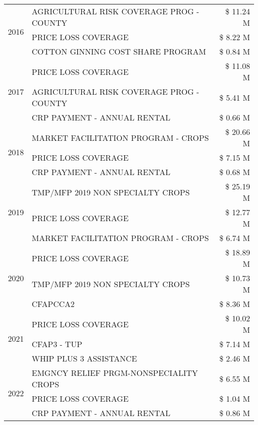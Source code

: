 \begin{tabular}{llr}
\cline{1-3}
\multirow[t]{3}{*}{2016} & AGRICULTURAL RISK COVERAGE PROG - COUNTY & \$ 11.24 M \\
 & PRICE LOSS COVERAGE & \$ 8.22 M \\
 & COTTON GINNING COST SHARE PROGRAM & \$ 0.84 M \\
\cline{1-3}
\multirow[t]{3}{*}{2017} & PRICE LOSS COVERAGE & \$ 11.08 M \\
 & AGRICULTURAL RISK COVERAGE PROG - COUNTY & \$ 5.41 M \\
 & CRP PAYMENT - ANNUAL RENTAL & \$ 0.66 M \\
\cline{1-3}
\multirow[t]{3}{*}{2018} & MARKET FACILITATION PROGRAM - CROPS & \$ 20.66 M \\
 & PRICE LOSS COVERAGE & \$ 7.15 M \\
 & CRP PAYMENT - ANNUAL RENTAL & \$ 0.68 M \\
\cline{1-3}
\multirow[t]{3}{*}{2019} & TMP/MFP 2019 NON SPECIALTY CROPS & \$ 25.19 M \\
 & PRICE LOSS COVERAGE & \$ 12.77 M \\
 & MARKET FACILITATION PROGRAM - CROPS & \$ 6.74 M \\
\cline{1-3}
\multirow[t]{3}{*}{2020} & PRICE LOSS COVERAGE & \$ 18.89 M \\
 & TMP/MFP 2019 NON SPECIALTY CROPS & \$ 10.73 M \\
 & CFAPCCA2 & \$ 8.36 M \\
\cline{1-3}
\multirow[t]{3}{*}{2021} & PRICE LOSS COVERAGE & \$ 10.02 M \\
 & CFAP3 - TUP & \$ 7.14 M \\
 & WHIP PLUS 3 ASSISTANCE & \$ 2.46 M \\
\cline{1-3}
\multirow[t]{3}{*}{2022} & EMGNCY RELIEF PRGM-NONSPECIALITY CROPS & \$ 6.55 M \\
 & PRICE LOSS COVERAGE & \$ 1.04 M \\
 & CRP PAYMENT - ANNUAL RENTAL & \$ 0.86 M \\
\cline{1-3}
\bottomrule
\end{tabular}
